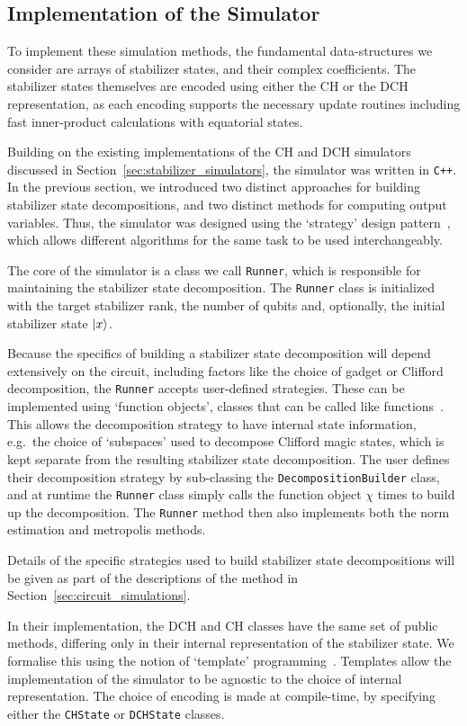 \subsection{Implementation of the Simulator}
To implement these simulation methods, the fundamental data-structures we consider are arrays of stabilizer states, and their complex coefficients. The stabilizer states themselves are encoded using either the CH or the DCH representation, as each encoding supports the necessary update routines including fast inner-product calculations with equatorial states.\par
Building on the existing implementations of the CH and DCH simulators discussed in Section~\ref{sec:stabilizer_simulators}, the simulator was written in \texttt{C++}. In the previous section, we introduced two distinct approaches for building stabilizer state decompositions, and two distinct methods for computing output variables. Thus, the simulator was designed using the `strategy' design pattern~\cite{GoF}, which allows different algorithms for the same task to be used interchangeably.\par
The core of the simulator is a class we call \texttt{Runner}, which is responsible for maintaining the stabilizer state decomposition. The \texttt{Runner} class is initialized with the target stabilizer rank, the number of qubits and, optionally, the initial stabilizer state $\ket{x}$.\par
Because the specifics of building a stabilizer state decomposition will depend extensively on the circuit, including factors like the choice of gadget or Clifford decomposition, the \texttt{Runner} accepts user-defined strategies. These can be implemented using `function objects', classes that can be called like functions~\cite{CPPRefFunctionObject}. This allows the decomposition strategy to have internal state information, e.g.\ the choice of `subspaces' used to decompose Clifford magic states, which is kept separate from the resulting stabilizer state decomposition. The user defines their decomposition strategy by sub-classing the \texttt{DecompositionBuilder} class, and at runtime the \texttt{Runner} class simply calls the function object $\chi$ times to build up the decomposition. The \texttt{Runner} method then also implements both the norm estimation and metropolis methods.\par
Details of the specific strategies used to build stabilizer state decompositions will be given as part of the descriptions of the method in Section~\ref{sec:circuit_simulations}.\par
In their implementation, the DCH and CH classes have the same set of public methods, differing only in their internal representation of the stabilizer state. We formalise this using the notion of `template' programming~\cite{GoF,CPPRefTemplates}. Templates allow the implementation of the simulator to be agnostic to the choice of internal representation. The choice of encoding is made at compile-time, by specifying either the \texttt{CHState} or \texttt{DCHState} classes.\par
